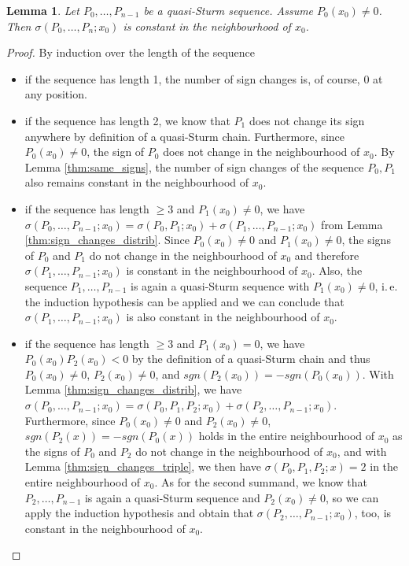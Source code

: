 \documentclass[11pt,a4paper,oneside]{article}
\newtheorem{lemma}[definition]{Lemma}
\newcommand{\sgn}{\mathit{sgn}}
\newcommand{\ie}{i.\,e.\xspace}
\begin{document}
\begin{lemma}\label{thm:nonzero}
Let $P_0,\ldots,P_{n-1}$ be a quasi-Sturm sequence. Assume $P_0(x_0)\neq 0$. Then $\sigma(P_0,\ldots,P_n; x_0)$ is constant in the neighbourhood of $x_0$.\\
\end{lemma}
\begin{proof}
By induction over the length of the sequence
\begin{itemize}
\item if the sequence has length 1, the number of sign changes is, of course, $0$ at any position.
\item if the sequence has length 2, we know that $P_1$ does not change its sign anywhere by definition of a quasi-Sturm chain. Furthermore, since $P_0(x_0)\neq 0$, the sign of $P_0$ does not change in the neighbourhood of $x_0$. By Lemma \ref{thm:same_signs}, the number of sign changes of the sequence $P_0,P_1$ also remains constant in the neighbourhood of $x_0$.
\item if the sequence has length $\geq 3$ and $P_1(x_0)\neq 0$, we have $\sigma(P_0,\ldots,P_{n-1}; x_0)=\sigma(P_0,P_1;x_0)+\sigma(P_1,\ldots,P_{n-1};x_0)$ from Lemma \ref{thm:sign_changes_distrib}. Since $P_0(x_0)\neq 0$ and $P_1(x_0)\neq 0$, the signs of $P_0$ and $P_1$ do not change in the neighbourhood of $x_0$ and therefore $\sigma(P_1,\ldots,P_{n-1};x_0)$ is constant in the neighbourhood of $x_0$. Also, the sequence $P_1,\ldots,P_{n-1}$ is again a quasi-Sturm sequence with $P_1(x_0)\neq 0$, \ie the induction hypothesis can be applied and we can conclude that $\sigma(P_1,\ldots,P_{n-1};x_0)$ is also constant in the neighbourhood of $x_0$.
\item if the sequence has length $\geq 3$ and $P_1(x_0)=0$, we have $P_0(x_0)P_2(x_0)<0$ by the definition of a quasi-Sturm chain and thus $P_0(x_0)\neq 0$, $P_2(x_0)\neq 0$, and $\mathit{sgn}(P_2(x_0))=-\mathit{sgn}(P_0(x_0))$. With Lemma \ref{thm:sign_changes_distrib}, we have $\sigma(P_0,\ldots,P_{n-1}; x_0) = \sigma(P_0,P_1,P_2;x_0) + \sigma(P_2,\ldots,P_{n-1}; x_0)$. Furthermore, since $P_0(x_0)\neq 0$ and $P_2(x_0)\neq 0$, $\sgn(P_2(x))=-\sgn(P_0(x))$ holds in the entire neighbourhood of $x_0$ as the signs of $P_0$ and $P_2$ do not change in the neighbourhood of $x_0$, and with Lemma \ref{thm:sign_changes_triple}, we then have $\sigma(P_0,P_1,P_2;x)=2$ in the entire neighbourhood of $x_0$. As for the second summand, we know that $P_2,\ldots,P_{n-1}$ is again a quasi-Sturm sequence and $P_2(x_0)\neq 0$, so we can apply the induction hypothesis and obtain that $\sigma(P_2,\ldots,P_{n-1};x_0)$, too, is constant in the neighbourhood of $x_0$.
\end{itemize}
\end{proof}
\end{document}
